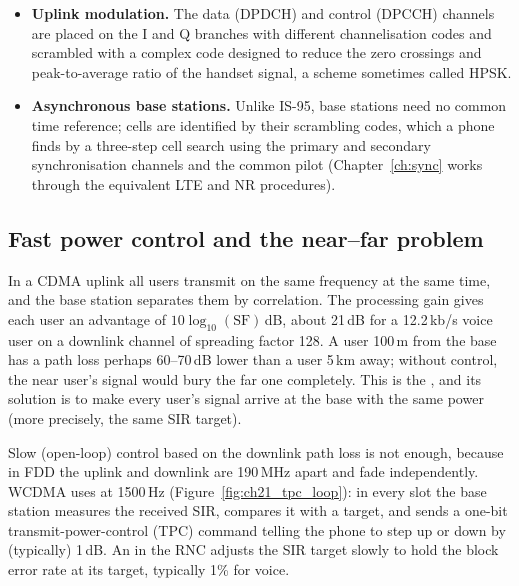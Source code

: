 \begin{itemize}
\item \textbf{Uplink modulation.} The data (DPDCH) and control (DPCCH) channels are placed on the I
and Q branches with different channelisation codes and scrambled with a complex code designed to
reduce the zero crossings and peak-to-average ratio of the handset signal, a scheme sometimes called
HPSK.
\item \textbf{Asynchronous base stations.} Unlike IS-95, base stations need no common time
reference; cells are identified by their scrambling codes, which a phone finds by a three-step cell
search using the primary and secondary synchronisation channels and the common pilot
(Chapter~\ref{ch:sync} works through the equivalent LTE and NR procedures).
\end{itemize}


\subsection{Fast power control and the near--far problem}

In a CDMA uplink all users transmit on the same frequency at the same time, and the base station
separates them by correlation. The processing gain gives each user an advantage of
$10\log_{10}(\mathrm{SF})$\,dB, about 21\,dB for a 12.2\,kb/s voice user on a downlink channel of
spreading factor 128. A user 100\,m from the base has a path loss perhaps 60--70\,dB lower than a user
5\,km away; without control, the near user's signal would bury the far one completely. This is the
, and its solution is to make every user's signal arrive at the base with
the same power (more precisely, the same SIR target).

Slow (open-loop) control based on the downlink path loss is not enough, because in FDD the uplink and
downlink are 190\,MHz apart and fade independently. WCDMA uses  at
1500\,Hz (Figure~\ref{fig:ch21_tpc_loop}): in every slot the base station measures the received SIR, compares it with a target, and
sends a one-bit transmit-power-control (TPC) command telling the phone to step up or down by
(typically) 1\,dB. An  in the RNC adjusts the SIR target slowly to hold the block
error rate at its target, typically 1\% for voice.

